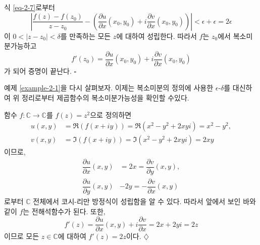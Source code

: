 식 \eqref{eq-2-7}로부터
\[
\left| \dfrac{f(z)-f(z_0)}{z-z_0} 
- \left( \dfrac{\partial u}{\partial x}(x_0,y_0) 
+ i \dfrac{\partial v}{\partial x}(x_0,y_0) \right) \right|
< \epsilon + \epsilon = 2\epsilon
\]
이 $0<|z-z_0|<\delta$를 만족하는 모든 $z$에 대하여 성립한다.
따라서 $f$는 $z_0$에서 복소미분가능하고
\[
f'(z_0) = \dfrac{\partial u}{\partial x}(x_0,y_0) 
+ i \dfrac{\partial v}{\partial x}(x_0,y_0) 
\]
가 되어 증명이 끝난다.
\hfill $\square$

예제 \ref{example-2-1}을 다시 살펴보자.
이제는 복소미분의 정의에 사용한 $\epsilon$-$\delta$를 대신하여
위 정리로부터 제곱함수의 복소미분가능성을 확인할 수있다.

\begin{saltexample}{}{} \label{example-2-7}
함수  $f:\mathbb C \to \mathbb C$를 $f(z) = z^2$으로 정의하면
\begin{align*}
u(x,y) &= \Re(f(x+iy)) = \Re(x^2-y^2+2xyi) = x^2-y^2, \\
v(x,y) &= \Im(f(x+iy)) = \Im(x^2-y^2+2xyi) = 2xy
\end{align*}
이므로, 
\begin{align*}
\dfrac{\partial u}{\partial x}(x,y) &= 2x = \dfrac{\partial v}{\partial y}(x,y), \\
\dfrac{\partial u}{\partial y}(x,y) & -2y = - \dfrac{\partial v}{\partial x}(x,y)
\end{align*}
로부터 $\mathbb C$ 전체에서 코시-리만 방정식이 성립함을 알 수 있다.
따라서 앞에서 보인 바와 같이 $f$는 전해석함수가 된다.
또한, 
\[
f'(z) = \dfrac{\partial u}{\partial x}(x,y) + i\dfrac{\partial v}{\partial x}
= 2x + 2yi = 2z
\]
이므로 모든 $z\in\mathbb C$에 대하여 $f'(z) = 2z$이다.
\hfill $\diamondsuit$
\end{saltexample}

